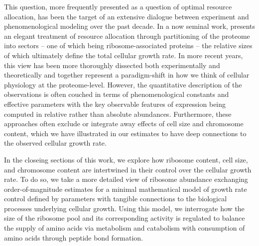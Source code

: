 
This question, more frequently presented as a question of optimal resource
allocation, has been the target of an extensive dialogue between experiment
and phenomenological modeling over the past decade. In a now seminal work,
\cite{scott2010} presents an elegant treatment of resource allocation through
partitioning of the proteome into sectors -- one of which being
ribosome-associated proteins -- the relative sizes of which ultimately define the total cellular growth rate. In
more recent years, this view has been more thoroughly
dissected both experimentally and theoretically
\citep{klumpp2014,basan2015,dai2018, dai2016, erickson2017} and together represent a paradigm-shift in how we think of cellular physiology at the
proteome-level. However, the quantitative description of the observations is often
couched in terms of phenomenological constants and effective parameters with the
key observable features of expression being computed in relative rather than
absolute abundances. Furthermore, these approaches often exclude or integrate
away effects of cell size and chromosome content, which we have illustrated in
our estimates to have deep connections to the observed cellular growth rate.  

In the closeing sections of this work, we explore how ribosome content, cell
size, and chromosome content are intertwined in their control over the cellular
growth rate. To do so, we take a more detailed view of ribosome abundance
exchanging order-of-magnitude estimates for a minimal mathematical  
model of growth rate control defined by parameters with
tangible connections to the biological processes underlying cellular growth.
Using this model, we interrogate how the size of the ribosome pool and its
corresponding activity is regulated to balance the supply of amino acids via metabolism and catabolism
with consumption of amino acids through peptide bond formation. 

